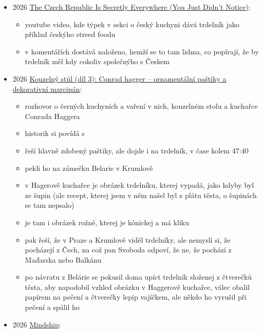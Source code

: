 \begin{itemize}
  \begin{itemize}
  \tightlist
  \item
    \emph{Skalický trdelník: Prečo tie z Prahy nemajú s originálom nič
    spoločné?}
  \item
    opakujou klasický mýty o původu trdelníku a Gvadánim, na druhou
    stranu zmiňujou, Ference Pozsonyho a že původně pochází Německa
  \item
    stěžujou si, že v Praze, ale i jinde není pravej trdelník a
    používají se netradiční posypky
  \end{itemize}
\item
  2026
  \href{https://www.youtube.com/watch?v=jXQ1Pi_20P4&lc=UgxFbrt1gvTVPdTuKpl4AaABAg.AUAolY948WOAUNznMfm18C}{The
  Czech Republic Is Secretly Everywhere (You Just Didn't Notice)}:

  \begin{itemize}
  \tightlist
  \item
    youtube video, kde týpek v sekci o český kuchyni dává trdelník jako
    příklad českýho streed foodu
  \item
    v komentářích dostává naloženo, hemží se to tam lidma, co popírají,
    že by trdelník měl kdy cokoliv společnýho s Českem
  \end{itemize}
\item
  2026
  \href{https://www.youtube.com/watch?v=YFBLQCVyJK4&list=PLfEGH366gTiXZUsWNilOS5J04rPPnn9sN&index=5}{Kouzelný
  stůl (díl 3): Conrad hagger -- ornamentální paštiky a dekorativní
  marcipán}:

  \begin{itemize}
  \tightlist
  \item
    rozhovor o černých kuchyních a vaření v nich, kouzelném stolu a
    kuchařce Conrada Haggera
  \item
    historik  si povídá s
  \item
    řeší hlavně zdobený paštiky, ale dojde i na trdelník, v čase kolem
    47:40
  \item
    pekli ho na zámečku Belarie v Krumlově
  \item
    v Hagerově kuchařce je obrázek trdelníku, kterej vypadá, jako kdyby
    byl ze šupin (ale recept, kterej jsem v něm našel byl z plátu těsta,
    o šupinách se tam nepsalo)
  \item
    je tam i obrázek rožně, kterej je kónickej a má kliku
  \item
    pak řeší, že v Praze a Krumlově viděl trdelníky, ale nemyslí si, že
    pocházejí z Čech, na což pan Svoboda odpoví, že ne, že pochází z
    Maďarska nebo Balkánu
  \item
    po návratu z Belárie se pokusil doma upíct trdelník složenej z
    čtverečků těsta, aby napodobil vzhled obrázku v Haggerově kuchařce,
    válec obalil papírem na pečení a čtverečky lepip vajíčkem, ale někdo
    ho vyrušil při pečení a spálil ho
  \end{itemize}
\item
  2026
  \href{https://donalclancy.wordpress.com/2026/03/30/traditional/}{Mindship}:


\end{itemize}
